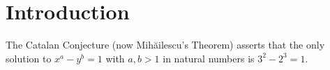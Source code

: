 
\section{Introduction}
The Catalan Conjecture (now Mihăilescu's Theorem) asserts that the only solution to
\( x^a - y^b = 1 \) with \( a, b > 1 \) in natural numbers is \( 3^2 - 2^3 = 1 \).

